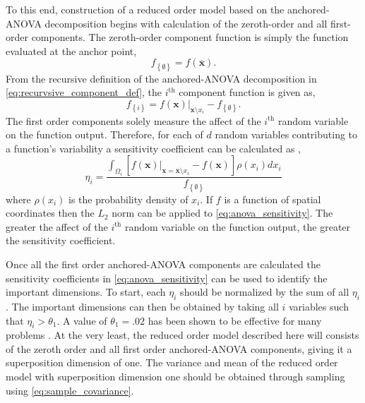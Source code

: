 To this end, construction of a reduced order model based on the anchored-\ac{ANOVA} decomposition begins with calculation of the zeroth-order and all first-order components. The zeroth-order component function is simply the function evaluated at the anchor point,
\begin{equation} \label{eq:zeroth_component}
   f_{\left\{\emptyset\right\}} = f(\overline{\textbf{x}}).  
\end{equation}  
From the recursive definition of the anchored-\ac{ANOVA} decomposition in \ref{eq:recurvsive_component_def}, the $i^{\text{th}}$ component function is given as,
\begin{equation} \label{eq:first_component}
   f_{\left\{i\right\}} = f(\textbf{x})\vert_{
    \textbf{x}\setminus x_i} - f_{\left\{\emptyset\right\}}. 
\end{equation} 
The first order components solely measure the affect of the $i^{\text{th}}$ random variable on the function output. Therefore, for each of $d$ random variables contributing to a function's variability a sensitivity coefficient can be calculated as \cite{AHSGC_HighDimensions},
\begin{equation} \label{eq:anova_sensitivity}
   \eta_i = \frac{
    \int_{\Omega_i}
     \left[f(\textbf{x})\vert_{
     \textbf{x}=\overline{\textbf{x}}\setminus x_i}
      -f(\textbf{x}) \right]\rho(x_i)dx_i}
       {
       f_{\left\{\emptyset\right\}}}
\end{equation}
where $\rho(x_i)$ is the probability density of $x_i$. If $f$ is a function of spatial coordinates then the $L_2$ norm can be applied to \ref{eq:anova_sensitivity}. The greater the affect of the $i^{\text{th}}$ random variable on the function output, the greater the sensitivity coefficient.

Once all the first order anchored-\ac{ANOVA} components are calculated the sensitivity coefficients in \ref{eq:anova_sensitivity} can be used to identify the important dimensions. To start, each $\eta_i$ should be normalized by the sum of all $\eta_i$. The important dimensions can then be obtained by taking all $i$ variables such that $\eta_i > \theta_1$. A value of $\theta_1 = .02$ has been shown to be effective for many problems \cite{Hesthaven_ANOVA}. At the very least, the reduced order model described here will consists of the zeroth order and all first order anchored-\ac{ANOVA} components, giving it a superposition dimension of one. The variance and mean of the reduced order model with superposition dimension one should be obtained through sampling using \ref{eq:sample_covariance}.  

